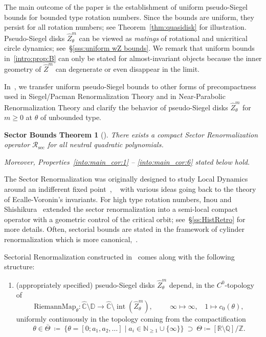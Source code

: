 \documentclass{amsart}
\renewcommand{\sp}{{\ \ }}
\newcommand{\1}{{\mathbb 1 }}
\newcommand\RR{\mathcal{R}}
\newcommand\intr{\operatorname{int}}
\newcommand{\wZ}{{\widehat Z}}
\newcommand{\wC}{\widehat{\mathbb{C}}}
\newcommand{\Q}{\mathbb{Q}}
\newcommand{\R}{\mathbb{R}}
\newcommand{\N}{\mathbb{N}}
\newcommand{\Z}{\mathbb{Z}}
\newcommand{\Disk}{\mathbb{D}}
\newtheorem{mainthm:sector_bounds}[thm]{Sector Bounds Theorem}
\theoremstyle{remark}
\numberwithin{equation}{section}
\theoremstyle{definition}
\renewcommand{\sec}{\mathrm{sec}}
\newcommand{\ovlTheta}{{\overline \Theta}}
\begin{document}
The main outcome of the paper is the establishment of uniform pseudo-Siegel bounds for bounded type rotation numbers. Since the bounds are uniform, they persist for all rotation numbers; see Theorem~\ref{thm:quasidisk} for illustration. Pseudo-Siegel disks $\wZ^m_\theta$ can be viewed as \emph{matings} of rotational and unicritical circle dynamics; see~\S\ref{sss:uniform wZ bounds}. We remark that uniform bounds in~\ref{intro:prop:B} can only be stated for almost-invariant objects because the inner geometry of $\wZ^m$ can degenerate or even disappear in the limit.







In~\cite{DL:sector bounds}, we transfer uniform pseudo-Siegel bounds to other forms of precompactness used in Siegel/Pacman Renormalization Theory and in Near-Parabolic Renormalization Theory and clarify the behavior of pseudo-Siegel disks $\wZ^m_\theta $ for $m\ge 0$ at $\theta$ of unbounded type. 

 \begin{mainthm:sector_bounds}[{\cite{DL:sector bounds}}] \label{thm:intro:sector bounds}There exists a compact Sector Renormalization operator $\RR_\sec$ for all neutral quadratic polynomials. 
 
 Moreover, Properties~\ref{into:main_cor:1} -- \ref{into:main_cor:6} stated below hold. 
\end{mainthm:sector_bounds}

 The Sector Renormalization was originally designed to study Local Dynamics around an indifferent fixed point~\cite[\S3.1]{D-Siegel}, ~\cite{Y} with various ideas going back to the theory of Ecalle-Voronin's invariants. For high type rotation numbers, Inou and Shishikura~\cite{IS} extended the sector renormalization into a semi-local compact operator with a geometric control of the critical orbit; see~\S\ref{ss:HistRetro} for more details. Often, sectorial bounds are stated in the framework of cylinder renormalization which is more canonical,~\cite{Ya-posmeas}. 
 
 Sectorial Renormalization constructed in~\cite{DL:sector bounds} comes along with the following structure:
\begin{enumerate}[label=\text{(\Roman*)},font=\normalfont,leftmargin=*]
\item \label{into:main_cor:1} (appropriately specified) pseudo-Siegel disks $\wZ^m_\theta$  depend, in the $C^0$-topology of
\[ \text{RiemannMap}_\theta\colon \wC\setminus \Disk\to \wC\setminus \intr(\wZ^m_\theta),\hspace{1cm}  \infty\mapsto \infty, \sp\sp 1\mapsto c_0(\theta),\]
 uniformly continuously in the topology coming from the compactification 
\[\theta\in \ovlTheta \ \coloneqq \ \big\{\theta= [0;a_1,a_2,\dots] \mid a_i \in \N_{\ge 1}\cup \{\infty\}\big\}\  \supset\ \Theta\coloneqq [\R\setminus \Q]/\Z.\]
\end{enumerate} 
\end{document}
